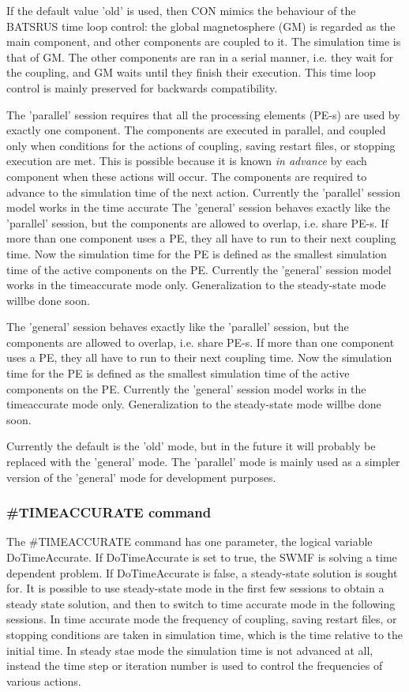 If the default value 'old' is used, then CON mimics the behaviour
of the BATSRUS time loop control: the global magnetosphere (GM) is regarded
as the main component, and other components are coupled to it.
The simulation time is that of GM. The other components are ran in 
a serial manner, i.e. they wait for the coupling, and GM waits until
they finish their execution. This time loop control is mainly preserved
for backwards compatibility.

The 'parallel' session requires that all the processing elements (PE-s)
are used by exactly one component. The components are executed in parallel,
and coupled only when conditions for the actions of coupling, saving restart 
files, or stopping execution are met. This is possible because it is known
{\it in advance} by each component when these actions will occur.
The components are required to advance to the simulation time of the next 
action. Currently the 'parallel' session model works in the time accurate 
The 'general' session behaves exactly like the 'parallel' session,
but the components are allowed to overlap, i.e. share PE-s.
If more than one component uses a PE, they all have to run to their
next coupling time. Now the simulation time for the PE is defined
as the smallest simulation time of the active components on the PE.
Currently the 'general' session model works in the timeaccurate
mode only. Generalization to the steady-state mode willbe done soon.

The 'general' session behaves exactly like the 'parallel' session,
but the components are allowed to overlap, i.e. share PE-s. 
If more than one component uses a PE, they all have to run to their
next coupling time. Now the simulation time for the PE is defined
as the smallest simulation time of the active components on the PE.
Currently the 'general' session model works in the timeaccurate
mode only. Generalization to the steady-state mode willbe done soon.

Currently the default is the 'old' mode, but in the future it
will probably be replaced with the 'general' mode.
The 'parallel' mode is mainly used as a simpler version of 
the 'general' mode for development purposes.

\subsubsection{\#TIMEACCURATE command}

The \#TIMEACCURATE command has one parameter, the logical variable
DoTimeAccurate. If DoTimeAccurate is set to true, the SWMF is solving
a time dependent problem. If DoTimeAccurate is false, a steady-state
solution is sought for. It is possible to use steady-state mode 
in the first few sessions to obtain a steady state solution,
and then to switch to time accurate mode in the following sessions.
In time accurate mode the frequency of coupling, saving restart files,
or stopping conditions are taken in simulation time, which is the 
time relative to the initial time. In steady stae mode the simulation
time is not advanced at all, instead the time step or iteration number 
is used to control the frequencies of various actions.

